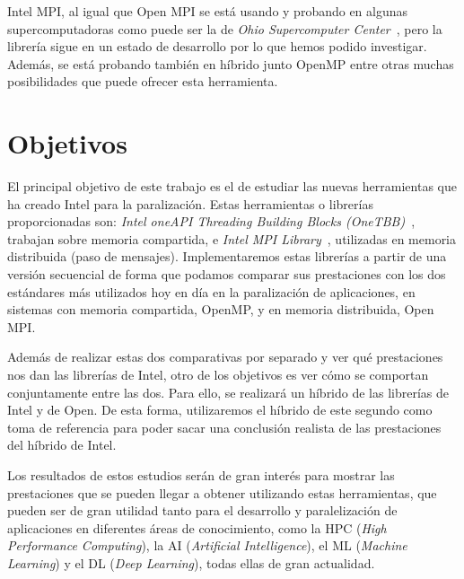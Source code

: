 \documentclass[a4paper,12pt]{article}
\begin{document}
Intel MPI, al igual que Open MPI se está usando y probando en algunas supercomputadoras como puede ser la de {\it Ohio Supercomputer Center}~\cite{super3}, pero la librería sigue en un estado de desarrollo por lo que hemos podido investigar. Además, se está probando también en híbrido junto OpenMP entre otras muchas posibilidades que puede ofrecer esta herramienta.




\newpage
\section{Objetivos} \label{sec:objetivos}

El principal objetivo de este trabajo es el de estudiar las nuevas herramientas que ha creado Intel para la paralización. Estas herramientas o librerías proporcionadas son: {\it Intel oneAPI Threading Building Blocks (OneTBB)}~\cite{tbb}, trabajan sobre memoria compartida, e {\it Intel MPI Library}~\cite{impi}, utilizadas en memoria distribuida (paso de mensajes). Implementaremos estas librerías a partir de una versión secuencial de forma que podamos comparar sus prestaciones con los dos estándares más utilizados hoy en día en la paralización de aplicaciones, en sistemas con memoria compartida, OpenMP, y en memoria distribuida, Open MPI.

Además de realizar estas dos comparativas por separado y ver qué prestaciones nos dan las librerías de Intel, otro de los objetivos es ver cómo se comportan conjuntamente entre las dos. Para ello, se realizará un híbrido de las librerías de Intel y de Open. De esta forma, utilizaremos el híbrido de este segundo como toma de referencia para poder sacar una conclusión realista de las prestaciones del híbrido de Intel.

Los resultados de estos estudios serán de gran interés para mostrar las prestaciones que se pueden llegar a obtener utilizando estas herramientas, que pueden ser de gran utilidad tanto para el desarrollo y paralelización de aplicaciones en diferentes áreas de conocimiento, como la HPC ({\it High Performance Computing}), la AI ({\it Artificial Intelligence}), el ML ({\it Machine Learning}) y el DL ({\it Deep Learning}), todas ellas de gran actualidad.
\end{document}
